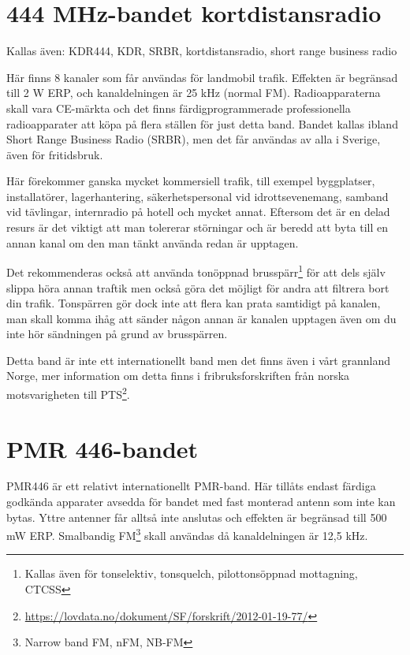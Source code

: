 \section{444 MHz-bandet kortdistansradio}

Kallas även: KDR444, KDR, SRBR, kortdistansradio, short range business radio

Här finns 8 kanaler som får användas för landmobil trafik. Effekten är begränsad till 2 W ERP, och kanaldelningen är 25 kHz (normal FM). Radioapparaterna skall vara CE-märkta och det finns färdigprogrammerade professionella radioapparater att köpa på flera ställen för just detta band. Bandet kallas ibland Short Range Business Radio (SRBR), men det får användas av alla i Sverige, även för fritidsbruk.

Här förekommer ganska mycket kommersiell trafik, till exempel byggplatser, installatörer, lagerhantering, säkerhetspersonal vid idrottsevenemang, samband vid tävlingar, internradio på hotell och mycket annat. Eftersom det är en delad resurs är det viktigt att man tolererar störningar och är beredd att byta till en annan kanal om den man tänkt använda redan är upptagen.

Det rekommenderas också att använda tonöppnad brusspärr\footnote{Kallas även för tonselektiv, tonsquelch, pilottonsöppnad mottagning, CTCSS} för att dels själv slippa höra annan traftik men också göra det möjligt för andra att filtrera bort din trafik. Tonspärren gör dock inte att flera kan prata samtidigt på kanalen, man skall komma ihåg att sänder någon annan är kanalen upptagen även om du inte hör sändningen på grund av brusspärren.

Detta band är inte ett internationellt band men det finns även i vårt grannland Norge, mer information om detta finns i fribruksforskriften från norska motsvarigheten till PTS\footnote{\url{https://lovdata.no/dokument/SF/forskrift/2012-01-19-77/}}.

\section{PMR 446-bandet}

PMR446 är ett relativt internationellt PMR-band. Här tillåts endast färdiga godkända apparater avsedda för bandet med fast monterad antenn som inte kan bytas. Yttre antenner får alltså inte anslutas och effekten är begränsad till 500 mW ERP. Smalbandig FM\footnote{Narrow band FM, nFM, NB-FM} skall användas då kanaldelningen är 12,5 kHz. 

